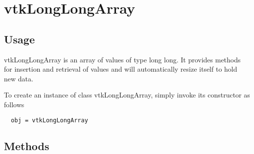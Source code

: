 \section{vtkLongLongArray}

\subsection{Usage}

 vtkLongLongArray is an array of values of type long long.
 It provides methods for insertion and retrieval of values and will
 automatically resize itself to hold new data.

To create an instance of class vtkLongLongArray, simply
invoke its constructor as follows
\begin{verbatim}
  obj = vtkLongLongArray
\end{verbatim}
\subsection{Methods}

